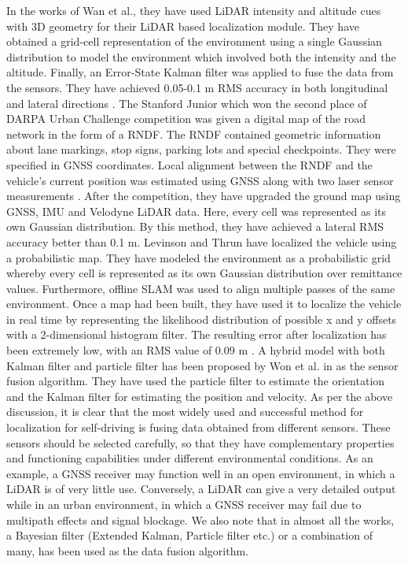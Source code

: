 In the works of Wan et al., they have used \gls{LiDAR} intensity and altitude cues with 3D geometry for their \gls{LiDAR} based localization module. They have obtained a grid-cell representation of the environment using a single Gaussian distribution to model the environment which involved both the intensity and the altitude. Finally, an Error-State Kalman filter was applied to fuse the data from the sensors. They have achieved 0.05-0.1 m \gls{RMS} accuracy in both longitudinal and lateral directions \cite{pa:Wan2018}. The Stanford Junior which won the second place of DARPA Urban Challenge competition was given a digital map of the road network in the form of a \gls{RNDF}. The \gls{RNDF} contained geometric information about lane markings, stop signs, parking lots and special checkpoints. They were specified in \gls{GNSS} coordinates. Local alignment between the \gls{RNDF} and the vehicle’s current position was estimated using \gls{GNSS} along with two laser sensor measurements \cite{pa:StanfordJunior}. After the competition, they have upgraded the ground map using \gls{GNSS}, \gls{IMU} and Velodyne \gls{LiDAR} data. Here, every cell was represented as its own Gaussian distribution. By this method, they have achieved a lateral \gls{RMS} accuracy better than 0.1 m. Levinson and Thrun have localized the vehicle using a probabilistic map. They have modeled the environment as a probabilistic grid whereby every cell is represented as its own Gaussian distribution over remittance values. Furthermore, offline \gls{SLAM} was used to align multiple passes of the same environment. Once a map had been built, they have used it to localize the vehicle in real time by representing the likelihood distribution of possible x and y offsets with a 2-dimensional histogram filter. The resulting error after localization has been extremely low, with an \gls{RMS} value of 0.09 m \cite{pa:Levinson2010}. A hybrid model with both Kalman filter and particle filter has been proposed by Won et al. in \cite{pa:Won2010} as the sensor fusion algorithm. They have used the particle filter to estimate the orientation and the Kalman filter for estimating the position and velocity.
As per the above discussion, it is clear that the most widely used and successful method for localization for self-driving is fusing data obtained from different sensors. These sensors should be selected carefully, so that they have complementary properties and functioning capabilities under different environmental conditions. As an example, a \gls{GNSS} receiver may function well in an open environment, in which a \gls{LiDAR} is of very little use. Conversely, a \gls{LiDAR} can give a very detailed output while in an urban environment, in which a \gls{GNSS} receiver may fail due to multipath effects and signal blockage. We also note that in almost all the works, a Bayesian filter (Extended Kalman, Particle filter etc.) or a combination of many, has been used as the data fusion algorithm. 

